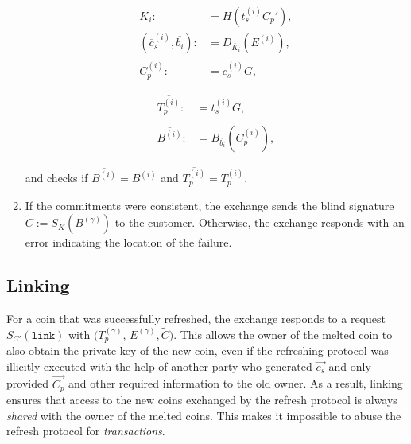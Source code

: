 \documentclass{llncs}
\begin{document}
\begin{enumerate}
    \vspace{-2ex}
    \begin{minipage}{5cm}
    \begin{align*}
      \overline{K}_i :&= H(t_s^{(i)} C_p'), \\
      (\overline{c}_s^{(i)}, \overline{b_i}) :&= D_{\overline{K}_i}(E^{(i)}), \\
     \overline{C^{(i)}_p} :&= \overline{c}_s^{(i)} G,
     \end{align*}
     \end{minipage}
    \begin{minipage}{5cm}
      \begin{align*}
       \overline{T_p^{(i)}} :&= t_s^{(i)} G, \\ \\
      \overline{B^{(i)}} :&= B_{\overline{b_i}}(\overline{C_p^{(i)}}),
      \end{align*}
    \end{minipage}

    and checks if $\overline{B^{(i)}} = B^{(i)}$
    and $\overline{T^{(i)}_p} = T^{(i)}_p$.


  \item \label{step:refresh-done} If the commitments were consistent,
    the exchange sends the blind signature $\widetilde{C} :=
    S_{K}(B^{(\gamma)})$ to the customer.  Otherwise, the exchange responds
    with an error indicating the location of the failure.
\end{enumerate}

%

\subsection{Linking}

For a coin that was successfully refreshed, the exchange responds to a
request $S_{C'}(\mathtt{link})$ with $(T^{(\gamma)}_p$, $E^{(\gamma)},
\widetilde{C})$.
%
This allows the owner of the melted coin to also obtain the private
key of the new coin, even if the refreshing protocol was illicitly
executed with the help of another party who generated $\vec{c_s}$ and only
provided $\vec{C_p}$ and other required information to the old owner.
As a result, linking ensures that access to the new coins exchanged by
the refresh protocol is always {\em shared} with the owner of the
melted coins.  This makes it impossible to abuse the refresh protocol
for {\em transactions}.
\end{document}
